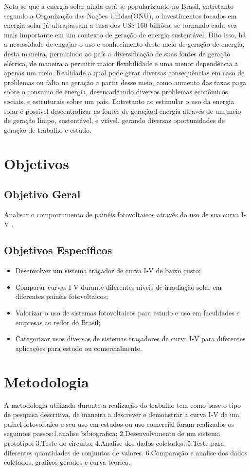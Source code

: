 \indent	Nota-se que a energia solar ainda está se popularizando no Brasil, entretanto segundo a Organização das Nações Unidas(ONU), o investimentos focados em energia solar já ultrapassam a casa dos US\$ 160 bilhões, se tornando cada vez mais importante em um contexto de geração de energia sustentável. Dito isso, há a necessidade de engajar o uso e conhecimento deste meio de geração de energia, desta maneira, permitindo ao país a diversificação de suas fontes de geração elétrica, de maneira a permitir maior flexibilidade e uma menor dependência a apenas um meio.
Realidade a qual pode gerar diversas consequências em caso de problemas ou falta na geração a partir desse meio, como aumento das taxas paga sobre o consumo de energia, desencadeando diversos problemas econômicos, sociais, e estruturais sobre um país. Entretanto ao estimular o uso da energia solar é possível descentralizar as fontes de geraçãod energia através de um meio de geração limpo, sustentável, e viável, gerando diversas oportunidades de geração de trabalho e estudo.


\section{Objetivos}

\subsection{Objetivo Geral}

Analisar o comportamento de painéis fotovoltaicos através do uso de sua curva I-V .

\subsection{Objetivos Específicos}
\begin{itemize}
	\item Desenvolver um sistema traçador de curva I-V de baixo custo;
	\item Comparar curvas I-V durante diferentes níveis de irradiação solar em diferentes painéis fotovoltaicos;
	\item Valorizar o uso de sistemas fotovoltaicos para estudo e uso em faculdades e empresas ao redor do Brasil;
	\item Categorizar usos diversos de sistemas traçadores de curva I-V para diferentes aplicações para estudo ou comercialmente.

\end{itemize}

\section{Metodologia}

A metodologia utilizada durante a realização do trabalho tem como base o tipo de pesquisa descritiva, de maneira a descrever e demonstrar a curva I-V de um painel fotovoltaico e seu uso em estudos ou uso comercial foram realizados os seguintes passos:1.analise bibiografica; 2.Desenvolvimento de um sistema prototipo; 3.Teste do circuito; 4.Analise dos dados coletados; 5.Teste para diferentes quantidades de conjuntos de valores. 6.Comparação e analise dos dados coletados, graficos gerados e curva teorica.
